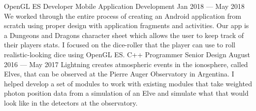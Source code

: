 \begin{cventries}
  \cventry%
    {OpenGL ES Developer}
    {Mobile Application Development}
    {}
    {Jan 2018 --- May 2018}
    {%
      We worked through the entire process of creating an Android application from
      scratch using proper design with application fragments and activities. Our
      app is a Dungeons and Dragons character sheet which allows the user to
      keep track of their players stats. I focused on the dice-roller that the
      player can use to roll realistic-looking dice using OpenGL ES.\@
    }
  \cventry%
    {C++ Programmer}
    {Senior Design}
    {}
    {August 2016 --- May 2017}
    {%
      Lightning creates atmospheric events in the ionosphere, called Elves, that
      can be observed at the Pierre Auger Observatory in Argentina. I helped
      develop a set of modules to work with existing modules that take weighted
      photon position data from a simulation of an Elve and simulate what that
      would look like in the detectors at the observatory.
    }
\end{cventries}
